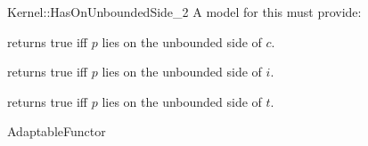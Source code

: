 \begin{ccRefFunctionObjectConcept}{Kernel::HasOnUnboundedSide_2}
A model for this must provide:


{returns true iff $p$ lies on the unbounded side of $c$.}

{returns true iff $p$ lies on the unbounded side of $i$.}

{returns true iff $p$ lies on the unbounded side of $t$.}

\ccRefines
AdaptableFunctor

\ccSeeAlso
{} \\
\\
\\

\end{ccRefFunctionObjectConcept}
